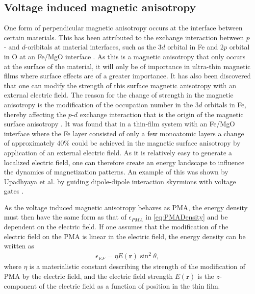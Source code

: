 \subsection{Voltage induced magnetic anisotropy} \label{sec:VIMA}
One form of perpendicular magnetic anisotropy occurs at the interface between certain materials. This has been attributed to the exchange interaction between $p$- and $d$-oribitals at material interfaces, such as the 3$d$ orbital in Fe and 2$p$ orbital in O at an Fe/MgO interface \cite{Matsukura2015}. As this is a magnetic anisotropy that only occurs at the surface of the material, it will only be of importance in ultra-thin magnetic films where surface effects are of a greater importance. It has also been discovered that one can modify the strength of this surface magnetic anisotropy with an external electric field. The reason for the change of strength in the magnetic anisotropy is the modification of the occupation number in the 3$d$ orbitals in Fe, thereby affecting the $p$-$d$ exchange interaction that is the origin of the magnetic surface anisotropy \cite{Maruyama2009}. It was found that in a thin-film system with an Fe/MgO interface where the Fe layer consisted of only a few monoatomic layers a change of approximately 40\% could be achieved in the magnetic surface anisotropy by application of an external electric field. As it is relatively easy to generate a localized electric field, one can therefore create an energy landscape to influence the dynamics of magnetization patterns. An example of this was shown by Upadhyaya et al. by guiding dipole-dipole interaction skyrmions with voltage gates \cite{Upadhyaya2015}.

As the voltage induced magnetic anisotropy behaves as PMA, the energy density must then have the same form as that of $\epsilon_{PMA}$ in \eqref{eq:PMADensity} and be dependent on the electric field. If one assumes that the modification of the electric field on the PMA is linear in the electric field, the energy density can be written as
\begin{align}
\epsilon_{EF} = \eta E(\mathbold{r}) \sin^2\theta,
\end{align}
where $\eta$ is a materialistic constant describing the strength of the modification of PMA by the electric field, and the electric field strength $E(\mathbold{r})$ is the $z$-component of the electric field as a function of position in the thin film. 

